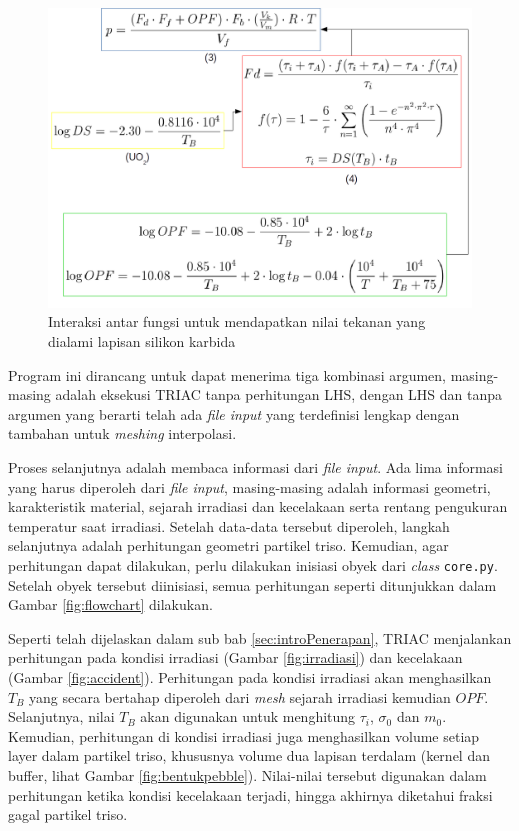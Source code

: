 \documentclass[a4paper,11pt]{report}
\begin{document}

\begin{figure}[h]
  \begin{center}
    \includegraphics[scale=.5]{pics/alurRumus2.png}
    \caption{Interaksi antar fungsi untuk mendapatkan nilai tekanan yang dialami lapisan silikon karbida}
    \label{fig:interaksiformula2}
  \end{center}
\end{figure}

Program ini dirancang untuk dapat menerima tiga kombinasi argumen, masing-masing adalah eksekusi TRIAC tanpa perhitungan LHS, dengan LHS dan tanpa argumen yang berarti telah ada \textit{file input} yang terdefinisi lengkap dengan tambahan untuk \textit{meshing} interpolasi.

Proses selanjutnya adalah membaca informasi dari \textit{file input}. Ada lima informasi yang harus diperoleh dari \textit{file input}, masing-masing adalah informasi geometri, karakteristik material, sejarah irradiasi dan kecelakaan serta rentang pengukuran temperatur saat irradiasi. Setelah data-data tersebut diperoleh, langkah selanjutnya adalah perhitungan geometri partikel triso. Kemudian, agar perhitungan dapat dilakukan, perlu dilakukan inisiasi obyek dari \textit{class} \texttt{core.py}. Setelah obyek tersebut diinisiasi, semua perhitungan seperti ditunjukkan dalam Gambar \ref{fig:flowchart} dilakukan.

Seperti telah dijelaskan dalam sub bab \ref{sec:introPenerapan}, TRIAC menjalankan perhitungan pada kondisi irradiasi (Gambar \ref{fig:irradiasi}) dan kecelakaan (Gambar \ref{fig:accident}). Perhitungan pada kondisi irradiasi akan menghasilkan $T_B$ yang secara bertahap diperoleh dari \textit{mesh} sejarah irradiasi kemudian $OPF$. Selanjutnya, nilai $T_B$ akan digunakan untuk menghitung $\tau_i$, $\sigma_0$ dan $m_0$. Kemudian, perhitungan di kondisi irradiasi juga menghasilkan volume setiap layer dalam partikel triso, khususnya volume dua lapisan terdalam (kernel dan buffer, lihat Gambar \ref{fig:bentukpebble}). Nilai-nilai tersebut digunakan dalam perhitungan ketika kondisi kecelakaan terjadi, hingga akhirnya diketahui fraksi gagal partikel triso. 
\end{document}
